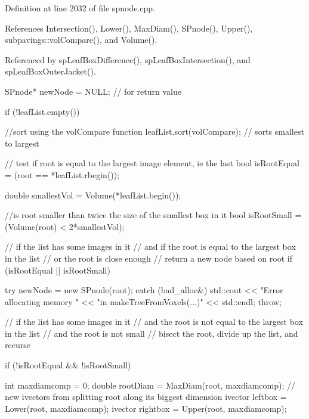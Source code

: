 \-Definition at line 2032 of file spnode.\-cpp.



\-References \-Intersection(), \-Lower(), \-Max\-Diam(), \-S\-Pnode(), \-Upper(), subpavings\-::vol\-Compare(), and \-Volume().



\-Referenced by sp\-Leaf\-Box\-Difference(), sp\-Leaf\-Box\-Intersection(), and sp\-Leaf\-Box\-Outer\-Jacket().


\begin{DoxyCode}
    {
        SPnode* newNode = NULL;  // for return value

        if (!leafList.empty())
        {
            //sort using the volCompare function
            leafList.sort(volCompare);   // sorts smallest to largest

            // test if root is equal to the largest image element, ie the last
            bool isRootEqual = (root == *leafList.rbegin());

            double smallestVol = Volume(*leafList.begin());

            //is root smaller than twice the size of the smallest box in it
            bool isRootSmall = (Volume(root) < 2*smallestVol);

            // if the list has some images in it
            // and if the root is equal to the largest box in the list
            // or the root is close enough
            // return a new node based on root
            if (isRootEqual || isRootSmall) {

                try {
                    newNode = new SPnode(root);
                }
                catch (bad_alloc&)
                {
                    std::cout << "Error allocating memory "
                        << "in makeTreeFromVoxels(...)" << std::endl;
                    throw;
                }
            }
            // if the list has some images in it
            // and the root is not equal to the largest box in the list
            // and the root is not small
            // bisect the root, divide up the list, and recurse

            if (!isRootEqual && !isRootSmall) {

                int maxdiamcomp = 0;
                double rootDiam = MaxDiam(root, maxdiamcomp);
                // new ivectors from splitting root along its biggest dimension
                ivector leftbox = Lower(root, maxdiamcomp);
                ivector rightbox = Upper(root, maxdiamcomp);

}}}
\end{DoxyCode}
